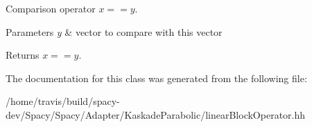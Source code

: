 Comparison operator $ x==y$. 


\begin{DoxyParams}{Parameters}
{\em y} & vector to compare with this vector \\
\hline
\end{DoxyParams}
\begin{DoxyReturn}{Returns}
$ x==y$. 
\end{DoxyReturn}


The documentation for this class was generated from the following file\-:\begin{DoxyCompactItemize}
\item 
/home/travis/build/spacy-\/dev/\-Spacy/\-Spacy/\-Adapter/\-Kaskade\-Parabolic/linear\-Block\-Operator.\-hh\end{DoxyCompactItemize}
